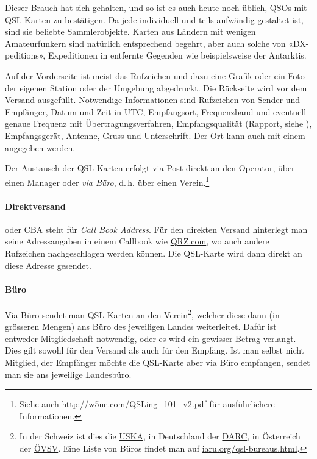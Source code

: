 Dieser Brauch hat sich gehalten, und so ist es auch heute noch üblich, QSOs mit QSL-Karten zu bestätigen. Da jede individuell und teils aufwändig gestaltet ist, sind sie beliebte Sammlerobjekte. Karten aus Ländern mit wenigen Amateurfunkern sind natürlich entsprechend begehrt, aber auch solche von «DX-peditions», Expeditionen in entfernte Gegenden wie beispielsweise der Antarktis. 

Auf der Vorderseite ist meist das Rufzeichen und dazu eine Grafik oder ein Foto der eigenen Station oder der Umgebung abgedruckt. Die Rückseite wird vor dem Versand ausgefüllt. Notwendige Informationen sind Rufzeichen von Sender und Empfänger, Datum und Zeit in UTC, Empfangsort, Frequenzband und eventuell genaue Frequenz mit Übertragungsverfahren, Empfangsqualität (Rapport, siehe ), Empfangsgerät, Antenne, Gruss und Unterschrift. Der Ort kann auch mit einem  angegeben werden.

Der Austausch der QSL-Karten erfolgt via Post direkt an den Operator, über einen Manager oder \textit{via Büro}, d.\,h. über einen Verein.\footnote{Siehe auch \href{http://w5ue.com/QSLing\_101\_v2.pdf}{http://w5ue.com/QSLing\_101\_v2.pdf} für ausführlichere Informationen.}

\paragraph{Direktversand}  oder \quad CBA steht für \textit{Call Book Address}. Für den direkten Versand hinterlegt man seine Adressangaben in einem Callbook wie \href{http://qrz.com}{QRZ.com}, wo auch andere Rufzeichen nachgeschlagen werden können. Die QSL-Karte wird dann direkt an diese Adresse gesendet.

\paragraph{Büro} \quad Via Büro sendet man QSL-Karten an den Verein\footnote{In der Schweiz ist dies die \href{http://uska.ch/mitgliederservice/qsl/}{USKA}, in Deutschland der \href{http://www.darc.de/geschaeftsstelle/qsl-buero/}{DARC}, in Österreich der \href{http://www.oevsv.at/oevsv/referate/referate\_admin/qslvermittlung/}{ÖVSV}. Eine Liste von Büros findet man auf \href{http://www.iaru.org/qsl-bureaus.html}{iaru.org/qsl-bureaus.html}.}, welcher diese dann (in grösseren Mengen) ans Büro des jeweiligen Landes weiterleitet.  Dafür ist entweder Mitgliedschaft notwendig, oder es wird ein gewisser Betrag verlangt. Dies gilt sowohl für den Versand als auch für den Empfang. Ist man selbst nicht Mitglied, der Empfänger möchte die QSL-Karte aber via Büro empfangen, sendet man sie ans jeweilige Landesbüro.

